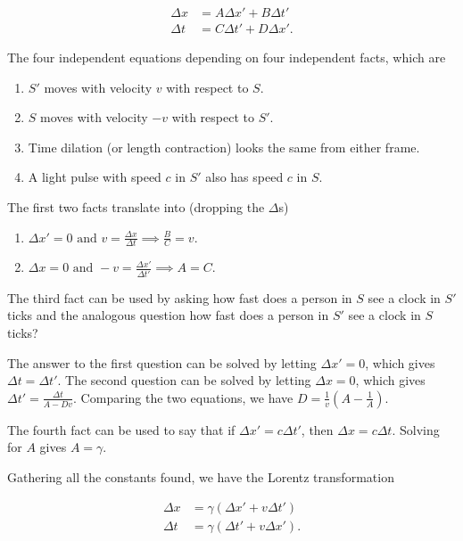 \documentclass[english,a4paper,12pt]{report}
\begin{document}
\begin{equation}
    \begin{aligned}
        \Delta x &= A \Delta x' + B \Delta t' \\
        \Delta t &= C \Delta t' + D \Delta x'. 
    \end{aligned}
\end{equation}

The four independent equations depending on four independent facts, which are 

\begin{enumerate}
    \item \(S'\) moves with velocity \(v\) with respect to \(S\).
    \item \(S\)  moves with velocity \(-v\) with respect to \(S'\). 
    \item Time dilation (or length contraction) looks the same from either frame.
    \item A light pulse with speed \(c\) in \(S'\) also has speed \(c\)  in \(S\).
\end{enumerate}

The first two facts translate into (dropping the \(\Delta \)s)

\begin{enumerate}
    \item \(\Delta x' = 0 \text { and } v = \frac{\Delta x}{\Delta t} \implies \frac{B}{C} = v \).
    \item \(\Delta x = 0 \text { and } -v = \frac{\Delta x'}{\Delta t'} \implies A = C \).  
\end{enumerate}

The third fact can be used by asking how fast does a person in \(S\) see a clock in \(S'\) ticks and the analogous question how fast does a person in \(S'\) see a clock in \(S\) ticks? 

The answer to the first question can be solved by letting \(\Delta x' = 0\), which gives \(\Delta t = \Delta t'\). The second question can be solved by letting \(\Delta x = 0\), which gives \(\Delta t' = \frac{\Delta t}{A - Dv} \). Comparing the two equations, we have \(D = \frac{1}{v}(A - \frac{1}{A}) \). 

The fourth fact can be used to say that if \(\Delta x' = c \Delta t'\), then \(\Delta x = c \Delta t\). Solving for \(A\)  gives \(A = \gamma \). 

Gathering all the constants found, we have the Lorentz transformation

\begin{equation}
    \begin{aligned}
    \Delta x &= \gamma (\Delta x' + v \Delta t') \\
    \Delta t &= \gamma (\Delta t' + v \Delta x').
    \end{aligned}
\end{equation}
\end{document}
